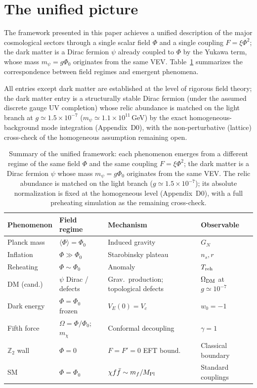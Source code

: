 \documentclass[pdflatex,sn-mathphys-num]{sn-jnl}
\newcommand{\MP}{M_{\rm Pl}}
\newcommand{\Ztwo}{\mathbb{Z}_2}
\newcommand{\PhiV}{\Phi_0}
\newcommand{\vev}[1]{\langle #1\rangle}
\theoremstyle{thmstyleone}
\begin{document}
\section{The unified picture}

The framework presented in this paper achieves a unified description of the major cosmological sectors through a single scalar field $\Phi$ and a single coupling $F=\xi\Phi^2$; the dark matter is a Dirac fermion $\psi$ already coupled to $\Phi$ by the Yukawa term, whose mass $m_\psi=g\PhiV$ originates from the same VEV. Table~\ref{tab:unified} summarizes the correspondence between field regimes and emergent phenomena.

All entries except dark matter are established at the level of rigorous field theory; the dark matter entry is a structurally stable Dirac fermion (under the assumed discrete gauge UV completion) whose relic abundance is matched on the light branch at $g\simeq1.5\times10^{-7}$ ($m_\psi\simeq1.1\times10^{11}\,$GeV) by the exact homogeneous-background mode integration (Appendix~D0), with the non-perturbative (lattice) cross-check of the homogeneous assumption remaining open.

\begin{table}[t]
\centering
\caption{Summary of the unified framework: each phenomenon emerges from a different regime of the same field $\Phi$ and the same coupling $F=\xi\Phi^2$; the dark matter is a Dirac fermion $\psi$ whose mass $m_\psi=g\PhiV$ originates from the same VEV. The relic abundance is matched on the light branch ($g\simeq1.5\times10^{-7}$); its absolute normalization is fixed at the homogeneous level (Appendix~D0), with a full preheating simulation as the remaining cross-check.}
\label{tab:unified}
\begin{tabular}{l|l|l|l}
Phenomenon & Field regime & Mechanism & Observable \\
\hline
Planck mass & $\vev{\Phi}=\PhiV$ & Induced gravity & $G_N$ \\
Inflation & $\Phi\gg\PhiV$ & Starobinsky plateau & $n_s,r$ \\
Reheating & $\Phi\sim\PhiV$ & Anomaly & $T_{\rm reh}$ \\
DM (cand.) & $\psi$ Dirac / defects & Grav.\ production; topological defects & $\Omega_{\rm DM}$ at $g\simeq10^{-7}$ \\
Dark energy & $\Phi=\PhiV$ frozen & $V_E(0)=V_c$ & $w_0=-1$ \\
Fifth force & $\Omega=\Phi/\PhiV$; $m_\chi$ & Conformal decoupling & $\gamma=1$ \\
$\Ztwo$ wall & $\Phi=0$ & $F=F'=0$ EFT bound. & Classical boundary \\
SM & $\Phi=\PhiV$ & $\chi f\bar f\sim m_f/\MP$ & Standard couplings \\
\end{tabular}
\end{table}
\end{document}
